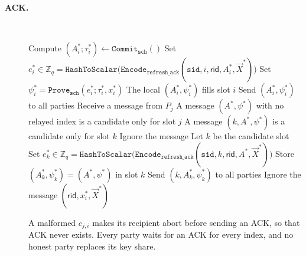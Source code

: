\documentclass[11pt]{article}
\newcommand{\ignore}[1]{}
\newcommand{\sid}{\ensuremath{\mathtt{sid}}}
\newcommand{\commit}[1]{\ensuremath{\mathtt{Commit}_{\mathtt{#1}}}}
\newcommand{\hashtoscalar}{\ensuremath{\mathtt{HashToScalar}}}
\newcommand{\prove}[1]{\ensuremath{\mathtt{Prove}_{\mathtt{#1}}}}
\newcommand{\verify}[1]{\ensuremath{\mathtt{Verify}_{\mathtt{#1}}}}
\newcommand{\Encode}[1][]{\ensuremath{\mathtt{Encode}_{\mathtt{#1}}}}
\newcommand{\rid}{\textsf{rid}}
\newcommand{\Z}{\mathbb{Z}}
\newcommand{\?}[1]{\stackrel{?}{#1}}
\newcommand{\todo}[1]{\textbf{\color{Red}{TBD: #1}}}
\begin{document}
\begin{description}
    \item[\textbf{ACK.}] \
    \begin{algorithmic}[1]
        \State Compute $(A^*_i; \tau^*_i) \gets \commit{sch}()$
        \State Set $e^*_i \in \Z_q = \hashtoscalar\bigl(\Encode[refresh\_ack](\sid, i, \rid, A^*_i, \vec X^*)\bigr)$
        \State Set $\psi^*_i = \prove{sch}(e^*_i; \tau^*_i, x^*_i)$
        \State The local $(A^*_i, \psi^*_i)$ fills slot $i$
        \State Send $(A^*_i, \psi^*_i)$ to all parties
         
            \State Receive a message from $P_j$
            \State A message $(A^*, \psi^*)$ with no relayed index is a candidate only for slot $j$
            \State A message $(k, A^*, \psi^*)$ is a candidate only for slot $k$
                \State Ignore the message
            \Else
                \State Let $k$ be the candidate slot
                \State Set $e^*_k \in \Z_q = \hashtoscalar\bigl(\Encode[refresh\_ack](\sid, k, \rid, A^*, \vec X^*)\bigr)$
                \If{$\verify{sch}(X^*_k, A^*, e^*_k, \psi^*)$}
                    \State Store $(A^*_k, \psi^*_k) = (A^*, \psi^*)$ in slot $k$
                    \State Send $(k, A^*_k, \psi^*_k)$ to all parties
                \Else
                    \State Ignore the message
                \EndIf
            \EndIf
        \EndWhile
        \State \Return $(\rid, x^*_i, \vec X^*)$
    \end{algorithmic}

    A malformed $c_{j,i}$ makes its recipient abort before sending an ACK, so that ACK never exists.
    Every party waits for an ACK for every index, and no honest party replaces its key share.

\end{description}

\ignore{
\section{Further Optimizations}

\todo{decide whether we want to move it into jira tickets/github issues}

\begin{enumerate}
    \item Full use of CRT: the CRT optimization can be used (when applicable) for all computations involving exponentiation, not just Paillier encryption

    \item Combine CRT and fixed-based multiexponentiation optimizations

    \item In some cases, can do probabilistic bath checks. It may also be possible to combine several of the ZK proofs. (Note, however, that these optimizations involve deviations from~\cite{cggmp24}.)
\end{enumerate}
}



\end{document}
